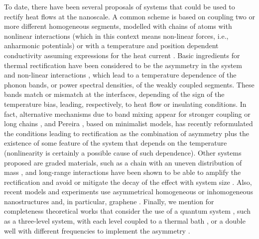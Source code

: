 To date, there have been several proposals of systems that could be used to rectify heat flows at the nanoscale.
A common scheme is based on coupling two or more different homogeneous segments, modelled with
chains of atoms with nonlinear interactions (which in this context means non-linear forces, i.e., anharmonic potentials) \cite{Terraneo2002,Li2004,Hu2006,Peyrard2006,Benenti2016}
or with a temperature and position dependent
conductivity assuming expressions for the heat current \cite{Peyrard2006,Hu2006a}.
Basic ingredients for thermal rectification have been considered to be  the asymmetry in the system and non-linear interactions
\cite{Zeng2008,Li2012,Benenti2016}, which lead to a temperature dependence of the phonon bands, or power spectral densities,  of the
weakly coupled \cite{Hu2006} segments. These bands match or mismatch at the interfaces, depending of the sign of the temperature bias, leading, respectively, to heat flow or insulating conditions. In fact, alternative mechanisms due to band mixing appear for stronger coupling
or long chains \cite{Hu2006}, and Pereira \cite{Pereira2017},  based on minimalist models,
has recently reformulated the conditions leading to rectification  as the combination of asymmetry plus the existence of some feature of the system that depends on the temperature (nonlinearity is certainly a possible cause of such dependence).
Other systems proposed are graded materials, such as a chain with an uneven distribution of mass \cite{Chang2006,Zeng2008,Chen2015}, and long-range interactions  have been shown to be able to amplify the rectification and avoid or mitigate the decay of the effect with system size \cite{Pereira2013,Chen2015}.
Also, recent models and experiments use asymmetrical homogeneous or inhomogeneous nanostructures and, in particular, graphene  \cite{Wang2014,Wang2017}.
Finally, we mention for completeness theoretical works
that consider the use of a quantum system \cite{Roberts2011}, such as a three-level system, with each level coupled to a thermal bath \cite{Joulain2016}, or a double well with different frequencies to implement the asymmetry \cite{Katz2016}.

